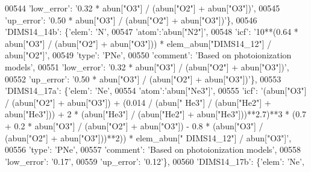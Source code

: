 \begin{DoxyCode}
00544                                        \textcolor{stringliteral}{'low\_error'}: \textcolor{stringliteral}{'0.32 * abun["O3"] / (abun["O2"] + abun["O3"])'},
00545                                        \textcolor{stringliteral}{'up\_error'}: \textcolor{stringliteral}{'0.50 * abun["O3"] / (abun["O2"] + abun["O3"])'}\},
00546                          \textcolor{stringliteral}{'DIMS14\_14b'}: \{\textcolor{stringliteral}{'elem'}: \textcolor{stringliteral}{'N'},
00547                                        \textcolor{stringliteral}{'atom'}:\textcolor{stringliteral}{'abun["N2"]'}, 
00548                                        \textcolor{stringliteral}{'icf'}: \textcolor{stringliteral}{'10**(0.64 * abun["O3"] / (abun["O2"] + abun["O3"])) *
       elem\_abun["DIMS14\_12"] / abun["O2"]'},
00549                                        \textcolor{stringliteral}{'type'}: \textcolor{stringliteral}{'PNe'},
00550                                        \textcolor{stringliteral}{'comment'}: \textcolor{stringliteral}{'Based on photoionization models'},
00551                                        \textcolor{stringliteral}{'low\_error'}: \textcolor{stringliteral}{'0.32 * abun["O3"] / (abun["O2"] + abun["O3"])'},
00552                                        \textcolor{stringliteral}{'up\_error'}: \textcolor{stringliteral}{'0.50 * abun["O3"] / (abun["O2"] + abun["O3"])'}\},
00553                          \textcolor{stringliteral}{'DIMS14\_17a'}: \{\textcolor{stringliteral}{'elem'}: \textcolor{stringliteral}{'Ne'},
00554                                        \textcolor{stringliteral}{'atom'}:\textcolor{stringliteral}{'abun["Ne3"]'}, 
00555                                        \textcolor{stringliteral}{'icf'}: \textcolor{stringliteral}{'(abun["O3"] / (abun["O2"] + abun["O3"]) + (0.014 / (abun["
      He3"] / (abun["He2"] + abun["He3"])) + 2 * (abun["He3"] / (abun["He2"] + abun["He3"]))**2.7)**3 * (0.7 + 0.2 *
       abun["O3"] / (abun["O2"] + abun["O3"]) - 0.8 * (abun["O3"] / (abun["O2"] + abun["O3"]))**2)) * elem\_abun["
      DIMS14\_12"] / abun["O3"]'},
00556                                        \textcolor{stringliteral}{'type'}: \textcolor{stringliteral}{'PNe'},
00557                                        \textcolor{stringliteral}{'comment'}: \textcolor{stringliteral}{'Based on photoionization models'},
00558                                        \textcolor{stringliteral}{'low\_error'}: \textcolor{stringliteral}{'0.17'},
00559                                        \textcolor{stringliteral}{'up\_error'}: \textcolor{stringliteral}{'0.12'}\},
00560                          \textcolor{stringliteral}{'DIMS14\_17b'}: \{\textcolor{stringliteral}{'elem'}: \textcolor{stringliteral}{'Ne'},

\end{DoxyCode}
